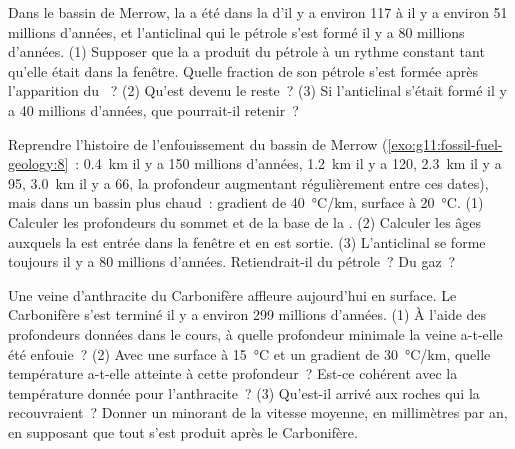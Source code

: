 \begin{exercise}[$\star\star\star$]\label{exo:g11:fossil-fuel-geology:13}
Dans le bassin de Merrow, la  a été dans la  d'il
y a environ 117 à il y a environ 51 millions d'années, et l'anticlinal qui
 le pétrole s'est formé il y a 80 millions d'années. (1) Supposer que
la  a produit du pétrole à un rythme constant tant qu'elle était
dans la fenêtre. Quelle fraction de son pétrole s'est formée après
l'apparition du ~? (2) Qu'est devenu le reste~? (3) Si l'anticlinal
s'était formé il y a 40 millions d'années, que pourrait-il retenir~?
\end{exercise}

\begin{exercise}[$\star\star\star$]\label{exo:g11:fossil-fuel-geology:14}
Reprendre l'histoire de l'enfouissement du bassin de Merrow
(\cref{exo:g11:fossil-fuel-geology:8}~: \qty{0.4}{km} il y a 150 millions
d'années, \qty{1.2}{km} il y a 120, \qty{2.3}{km} il y a 95, \qty{3.0}{km}
il y a 66, la profondeur augmentant régulièrement entre ces dates), mais
dans un bassin plus chaud~: gradient de \qty{40}{\degreeCelsius/km},
surface à \qty{20}{\degreeCelsius}. (1) Calculer les profondeurs du sommet
et de la base de la . (2) Calculer les âges auxquels la
 est entrée dans la fenêtre et en est sortie. (3) L'anticlinal se
forme toujours il y a 80 millions d'années. Retiendrait-il du pétrole~? Du
gaz~?
\end{exercise}

\begin{exercise}[$\star\star\star$]\label{exo:g11:fossil-fuel-geology:15}
Une veine d'anthracite du Carbonifère affleure aujourd'hui en surface. Le
Carbonifère s'est terminé il y a environ 299 millions d'années. (1) À
l'aide des profondeurs données dans le cours, à quelle profondeur minimale
la veine a-t-elle été enfouie~? (2) Avec une surface à
\qty{15}{\degreeCelsius} et un gradient de \qty{30}{\degreeCelsius/km},
quelle température a-t-elle atteinte à cette profondeur~? Est-ce cohérent
avec la température donnée pour l'anthracite~? (3) Qu'est-il arrivé aux
roches qui la recouvraient~? Donner un minorant de la vitesse moyenne, en
millimètres par an, en supposant que tout s'est produit après le
Carbonifère.
\end{exercise}

